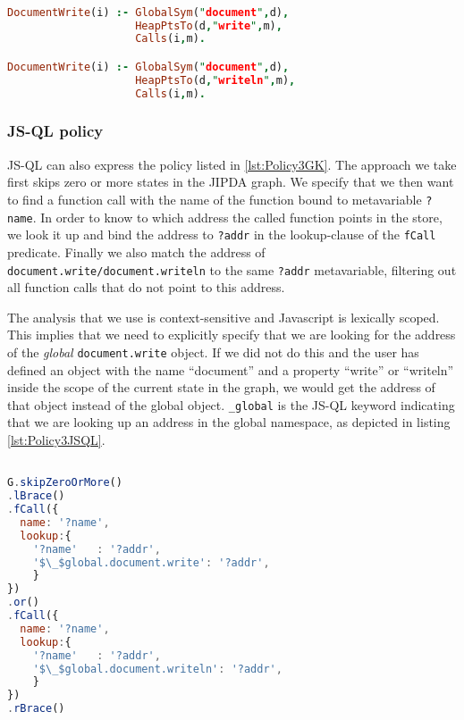 \begin{lstlisting}[label={lst:Policy3GK},language=Prolog,caption=Policy 3 in GateKeeper,mathescape=true]  % float=t?

DocumentWrite(i) :- GlobalSym("document",d),
                    HeapPtsTo(d,"write",m),
                    Calls(i,m).

DocumentWrite(i) :- GlobalSym("document",d),
                    HeapPtsTo(d,"writeln",m),
                    Calls(i,m).
\end{lstlisting}


\subsubsection*{JS-QL policy}

JS-QL can also express the policy listed in \ref{lst:Policy3GK}. The approach we take first skips zero or more states in the JIPDA graph. We specify that we then want to find a function call with the name of the function bound to metavariable \texttt{?name}. In order to know to which address the called function points in the store, we look it up and bind the address to \texttt{?addr} in the lookup-clause of the \texttt{fCall} predicate. Finally we also match the address of \texttt{document.write/document.writeln} to the same \texttt{?addr} metavariable, filtering out all function calls that do not point to this address.

The analysis that we use is context-sensitive and Javascript is lexically scoped. This implies that we need to explicitly specify that we are looking for the address of the \textit{global} \texttt{document.write} object. If we did not do this and the user has defined an object with the name ``document'' and a property ``write'' or ``writeln'' inside the scope of the current state in the graph, we would get the address of that object instead of the global object. \texttt{\_global} is the JS-QL keyword indicating that we are looking up an address in the global namespace, as depicted in listing \ref{lst:Policy3JSQL}.

\begin{lstlisting}[label={lst:Policy3JSQL},language=JavaScript,caption=Policy 3 in JS-QL,mathescape=true]  % float=t?

G.skipZeroOrMore()
.lBrace()
.fCall({
  name: '?name',
  lookup:{
    '?name'   : '?addr',
    '$\_$global.document.write': '?addr',
    }
})
.or()
.fCall({
  name: '?name',
  lookup:{
    '?name'   : '?addr',
    '$\_$global.document.writeln': '?addr',
    }
})
.rBrace()
\end{lstlisting}

